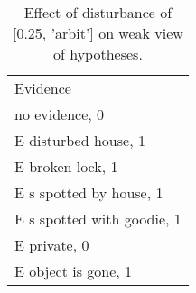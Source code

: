 \begin{table}\begin{tabular}{l}\toprule\multirow{2}{*}{Evidence} \\\\\midrule
no evidence, 0 & \\E disturbed house, 1 & \\E broken lock, 1 & \\E s spotted by house, 1 & \\E s spotted with goodie, 1 & \\E private, 0 & \\E object is gone, 1 & \\\bottomrule\end{tabular}\caption{Effect of disturbance of [0.25, 'arbit'] on weak view of hypotheses.}\end{table}